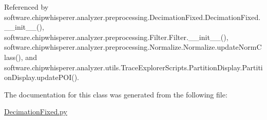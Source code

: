 Referenced by software.\+chipwhisperer.\+analyzer.\+preprocessing.\+Decimation\+Fixed.\+Decimation\+Fixed.\+\_\+\+\_\+init\+\_\+\+\_\+(), software.\+chipwhisperer.\+analyzer.\+preprocessing.\+Filter.\+Filter.\+\_\+\+\_\+init\+\_\+\+\_\+(), software.\+chipwhisperer.\+analyzer.\+preprocessing.\+Normalize.\+Normalize.\+update\+Norm\+Class(), and software.\+chipwhisperer.\+analyzer.\+utils.\+Trace\+Explorer\+Scripts.\+Partition\+Display.\+Partition\+Display.\+update\+P\+O\+I().




The documentation for this class was generated from the following file\+:\begin{DoxyCompactItemize}
\item 
\hyperlink{DecimationFixed_8py}{Decimation\+Fixed.\+py}\end{DoxyCompactItemize}

